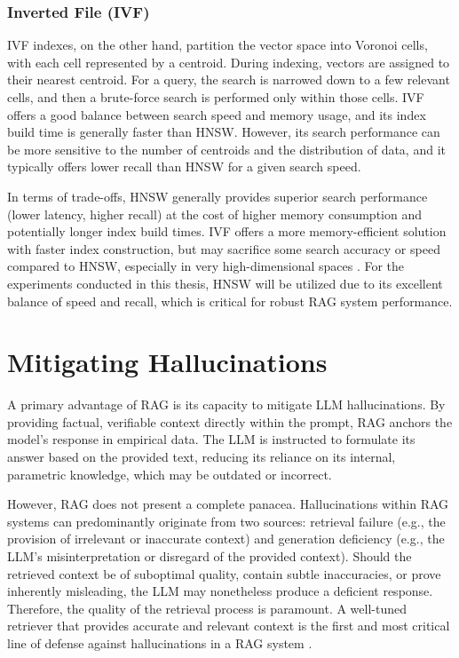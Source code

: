 \subsubsection{Inverted File (IVF)}
IVF indexes, on the other hand, partition the vector space into Voronoi cells, with each cell represented by a centroid. During indexing, vectors are assigned to their nearest centroid. For a query, the search is narrowed down to a few relevant cells, and then a brute-force search is performed only within those cells. IVF offers a good balance between search speed and memory usage, and its index build time is generally faster than HNSW. However, its search performance can be more sensitive to the number of centroids and the distribution of data, and it typically offers lower recall than HNSW for a given search speed.

In terms of trade-offs, HNSW generally provides superior search performance (lower latency, higher recall) at the cost of higher memory consumption and potentially longer index build times. IVF offers a more memory-efficient solution with faster index construction, but may sacrifice some search accuracy or speed compared to HNSW, especially in very high-dimensional spaces \autocite{aumuller2017ann}. For the experiments conducted in this thesis, HNSW will be utilized due to its excellent balance of speed and recall, which is critical for robust RAG system performance.

\section{Mitigating Hallucinations}
A primary advantage of RAG is its capacity to mitigate LLM hallucinations. By providing factual, verifiable context directly within the prompt, RAG anchors the model's response in empirical data. The LLM is instructed to formulate its answer based on the provided text, reducing its reliance on its internal, parametric knowledge, which may be outdated or incorrect.

However, RAG does not present a complete panacea. Hallucinations within RAG systems can predominantly originate from two sources: retrieval failure (e.g., the provision of irrelevant or inaccurate context) and generation deficiency (e.g., the LLM's misinterpretation or disregard of the provided context). Should the retrieved context be of suboptimal quality, contain subtle inaccuracies, or prove inherently misleading, the LLM may nonetheless produce a deficient response. Therefore, the quality of the retrieval process is paramount. A well-tuned retriever that provides accurate and relevant context is the first and most critical line of defense against hallucinations in a RAG system \autocite{gao2024retrievalaugmented}.